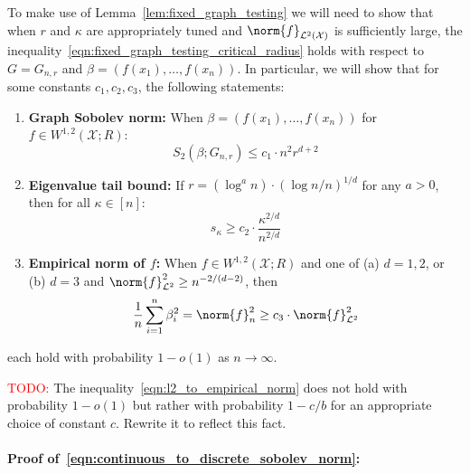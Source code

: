 \documentclass{article}
\newcommand{\1}{\mathbf{1}}
\newcommand{\Leb}{\mathcal{L}}
\theoremstyle{alden}
\theoremstyle{aldenthm}
\theoremstyle{definition}
\theoremstyle{remark}
\begin{document}
To make use of Lemma~\ref{lem:fixed_graph_testing} we will need to show that when $r$ and $\kappa$ are appropriately tuned and $\norm{f}_{\Leb^2(\mathcal{X})}$ is sufficiently large, the inequality~\eqref{eqn:fixed_graph_testing_critical_radius} holds with respect to $G = G_{n,r}$ and $\beta = (f(x_1),\ldots,f(x_n))$. In particular, we will show that for some constants $c_1,c_2,c_3$, the following statements:
\begin{enumerate}[label=(E\arabic*)]
	\item 
	\label{event:discrete_sobolev_norm}
	\textbf{Graph Sobolev norm:} When $\beta = (f(x_1),\ldots,f(x_n))$ for $f \in W^{1,2}(\mathcal{X};R)$:
	\begin{equation}
	\label{eqn:continuous_to_discrete_sobolev_norm}
	S_2(\beta;G_{n,r}) \leq c_1 \cdot n^2 r^{d + 2} 
	\end{equation}
	\item 
	\label{event:eigenvalue_tail_decay}
	\textbf{Eigenvalue tail bound:} If $r = (\log^{a}n)\cdot(\log n/n)^{1/d}$ for any $a > 0$, then for all $\kappa \in [n]$:
	\begin{equation}
	\label{eqn:eigenvalue_tail_bound}
	s_{\kappa} \geq c_2 \cdot \frac{\kappa^{2/d}}{n^{2/d}}
	\end{equation}
	\item 
	\label{event:l2_norm}
	\textbf{Empirical norm of $f$:} When $f \in W^{1,2}(\mathcal{X};R)$ and one of (a) $d = 1,2$, or (b) $d = 3$ and $\norm{f}_{\Leb^2}^2 \geq n^{-2/(d - 2)}$, then
	\begin{equation}
	\label{eqn:l2_to_empirical_norm}
	\frac{1}{n}\sum_{i = 1}^{n}\beta_i^2 = \norm{f}_n^2 \geq c_3 \cdot \norm{f}_{\Leb^2}^2
	\end{equation}
\end{enumerate} 

each hold with probability $1 - o(1)$ as $n \to \infty$. 

\textcolor{red}{TODO:} The inequality~\eqref{eqn:l2_to_empirical_norm} does not hold with probability $1 - o(1)$ but rather with probability $1 - c/b$ for an appropriate choice of constant $c$. Rewrite it to reflect this fact.

\paragraph{Proof of~\eqref{eqn:continuous_to_discrete_sobolev_norm}:}
\end{document}

